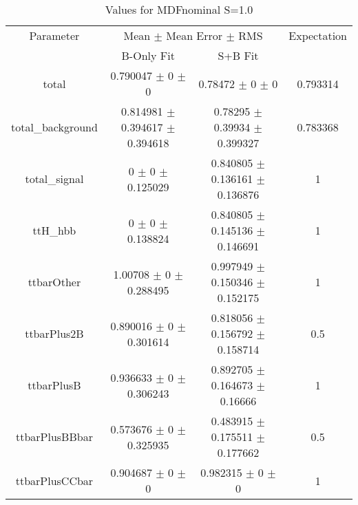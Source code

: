 \begin{table}
\centering
\caption{Values for MDFnominal S=1.0}
\begin{tabular}{cccc}
\toprule
Parameter & \multicolumn{2}{c}{Mean $\pm$ Mean Error $\pm$ RMS} & Expectation\\
 & B-Only Fit & S+B Fit & \\
\midrule
total & \num{0.790047} $\pm$ \num{0} $\pm$ \num{0} & \num{0.78472} $\pm$ \num{0} $\pm$ \num{0} & \num{0.793314}\\
total\_background & \num{0.814981} $\pm$ \num{0.394617} $\pm$ \num{0.394618} & \num{0.78295} $\pm$ \num{0.39934} $\pm$ \num{0.399327} & \num{0.783368}\\
total\_signal & \num{0} $\pm$ \num{0} $\pm$ \num{0.125029} & \num{0.840805} $\pm$ \num{0.136161} $\pm$ \num{0.136876} & \num{1}\\
ttH\_hbb & \num{0} $\pm$ \num{0} $\pm$ \num{0.138824} & \num{0.840805} $\pm$ \num{0.145136} $\pm$ \num{0.146691} & \num{1}\\
ttbarOther & \num{1.00708} $\pm$ \num{0} $\pm$ \num{0.288495} & \num{0.997949} $\pm$ \num{0.150346} $\pm$ \num{0.152175} & \num{1}\\
ttbarPlus2B & \num{0.890016} $\pm$ \num{0} $\pm$ \num{0.301614} & \num{0.818056} $\pm$ \num{0.156792} $\pm$ \num{0.158714} & \num{0.5}\\
ttbarPlusB & \num{0.936633} $\pm$ \num{0} $\pm$ \num{0.306243} & \num{0.892705} $\pm$ \num{0.164673} $\pm$ \num{0.16666} & \num{1}\\
ttbarPlusBBbar & \num{0.573676} $\pm$ \num{0} $\pm$ \num{0.325935} & \num{0.483915} $\pm$ \num{0.175511} $\pm$ \num{0.177662} & \num{0.5}\\
ttbarPlusCCbar & \num{0.904687} $\pm$ \num{0} $\pm$ \num{0} & \num{0.982315} $\pm$ \num{0} $\pm$ \num{0} & \num{1}\\
\bottomrule
\end{tabular}
\end{table}